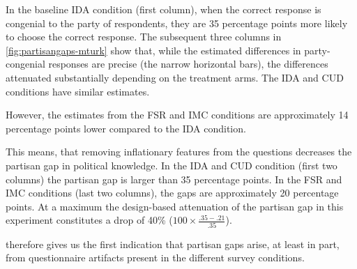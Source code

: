 \documentclass[12pt, letterpaper]{article}
\begin{document}
	In the baseline IDA condition (first column), when the correct response is congenial to the party of respondents, they are 35 percentage points more likely to choose the correct response.
	The subsequent three columns in \cref{fig:partisangaps-mturk} show that, while the estimated differences in party-congenial responses are precise (the narrow horizontal bars), the differences attenuated substantially depending on the treatment arms. The IDA and CUD conditions have similar estimates.
	
	However, the estimates from the FSR and IMC conditions are approximately 14 percentage points lower compared to the IDA condition.
	
	This means, that removing inflationary features from the questions decreases the partisan gap in political knowledge.
	In the IDA and CUD condition (first two columns) the partisan gap is larger than 35 percentage points. In the FSR and IMC conditions (last two columns), the gaps are approximately 20 percentage points. At a maximum the design-based attenuation of the partisan gap in this experiment constitutes a drop of 40\% ($100 \times \frac{.35-.21}{.35}$). 
	
	 therefore gives us the first indication that partisan gaps arise, at least in part, from questionnaire artifacts present in the different survey conditions.
	
	
	
\end{document}
